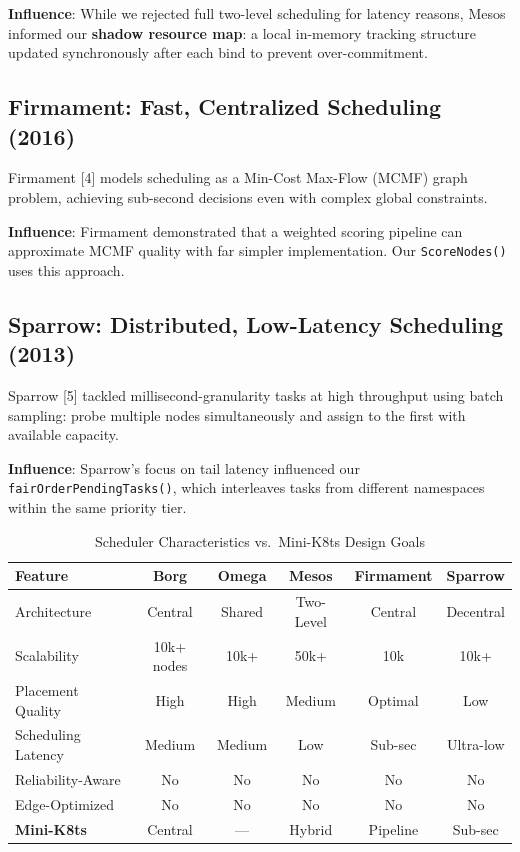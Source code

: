\documentclass[11pt,a4paper]{article}
\begin{document}
\textbf{Influence}: While we rejected full two-level scheduling for latency reasons, Mesos
informed our \textbf{shadow resource map}: a local in-memory tracking structure updated
synchronously after each bind to prevent over-commitment.

\subsection{Firmament: Fast, Centralized Scheduling (2016)}

Firmament [4] models scheduling as a Min-Cost Max-Flow (MCMF) graph problem, achieving
sub-second decisions even with complex global constraints.

\textbf{Influence}: Firmament demonstrated that a weighted scoring pipeline can approximate
MCMF quality with far simpler implementation. Our \texttt{ScoreNodes()} uses this approach.

\subsection{Sparrow: Distributed, Low-Latency Scheduling (2013)}

Sparrow [5] tackled millisecond-granularity tasks at high throughput using batch sampling:
probe multiple nodes simultaneously and assign to the first with available capacity.

\textbf{Influence}: Sparrow's focus on tail latency influenced our \texttt{fairOrderPendingTasks()},
which interleaves tasks from different namespaces within the same priority tier.

\begin{table}[H]
\centering
\caption{Scheduler Characteristics vs.\ Mini-K8ts Design Goals}
\label{tab:literature}
\begin{tabular}{@{} l c c c c c @{}}
\toprule
\textbf{Feature}     & \textbf{Borg} & \textbf{Omega} & \textbf{Mesos} & \textbf{Firmament} & \textbf{Sparrow} \\
\midrule
Architecture         & Central       & Shared         & Two-Level      & Central            & Decentral        \\
Scalability          & 10k+ nodes    & 10k+           & 50k+           & 10k                & 10k+             \\
Placement Quality    & High          & High           & Medium         & Optimal            & Low              \\
Scheduling Latency   & Medium        & Medium         & Low            & Sub-sec            & Ultra-low        \\
Reliability-Aware    & No            & No             & No             & No                 & No               \\
Edge-Optimized       & No            & No             & No             & No                 & No               \\
\midrule
\textbf{Mini-K8ts}   & Central       & ---            & Hybrid         & Pipeline           & Sub-sec          \\
\bottomrule
\end{tabular}
\end{table}
\end{document}
